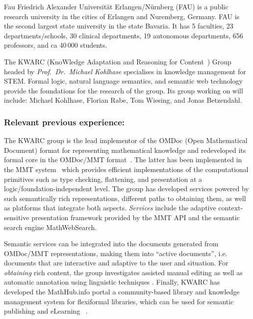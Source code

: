 \begin{sitedescription}{Fau}
  Friedrich Alexander Universit\"at Erlangen/N\"urnberg (FAU) is a public research
  university in the cities of Erlangen and Nuremberg, Germany. FAU is the second largest
  state university in the state Bavaria. It has 5 faculties, 23 departments/schools, 30
  clinical departments, 19 autonomous departments, 656 professors, and ca 40\,000
  students.

  The KWARC (KnoWledge Adaptation and Reasoning for Content~\cite{KWARC:online}) Group
  headed by {\emph{Prof.\ Dr.\ Michael Kohlhase}} specialises in knowledge management for
  STEM.  Formal logic, natural language semantics, and semantic web technology provide the
  foundations for the research of the group. Its group working on \pn will include: Michael
  Kohlhase, Florian Rabe, Tom Wiesing, and Jonas Betzendahl.

% 
% 
% 

\subsubsection*{Relevant previous experience:}

The KWARC group is the lead implementor of the OMDoc (Open Mathematical Document) format
for representing mathematical knowledge \cite{Kohlhase:OMDoc1.2} and redeveloped its
formal core in the OMDoc/MMT format~\cite{RabKoh:WSMSML13}. The latter has been
implemented in the MMT system~\cite{MMTSVN:on,RabKoh:WSMSML13} which provides efficient
implementations of the computational primitives such as type checking, flattening, and
presentation at a logic/foundation-independent level.  The group has developed services
powered by such semantically rich representations, different paths to obtaining them, as
well as platforms that integrate both aspects.  \emph{Services} include the adaptive
context-sensitive presentation framework provided by the MMT API and the semantic search
engine MathWebSearch\cite{KohSuc:asemf06,ProKoh:mwssofse12}. 

Semantic services can be integrated into the documents generated from OMDoc/MMT
representations, making them into ``active documents'', i.e. documents that are
interactive and adaptive to the user and situation.  For \emph{obtaining} rich content,
the group investigates assisted manual editing \cite{JucKoh:sidesc10:biblatex} as well as
automatic annotation using linguistic techniques \cite{GinJucAnc:alsaacl09}.  Finally,
KWARC has developed the \textsf{MathHub.info} portal a community-based library and
knowledge management system for flexiformal libraries, which can be used for semantic
publishing and eLearning~ \cite{KohDavGin:psewads11,MathHub:on,IanJucKoh:sdm14}.


\end{sitedescription}
